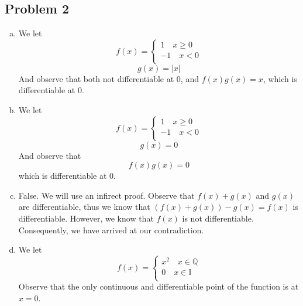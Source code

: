 \documentclass[12pt]{article}
\begin{document}
\subsection*{Problem 2}
\begin{enumerate}[a).]
    \item {
        We let
        $$ 
                f(x) = \left\{ 
                    \begin{array}{ll} 
                        1 \quad   x \ge 0\\
                        -1 \quad   x < 0\\
                    \end{array} \right.
        $$
        $$ 
                g(x) = |x|
        $$
        And observe that both not differentiable at $0$, and $f(x)g(x) = x$, which is differentiable at $0$. 
    }
    \item {
        We let 
        $$ 
                f(x) = \left\{ 
                    \begin{array}{ll} 
                        1 \quad   x \ge 0\\
                        -1 \quad   x < 0\\
                    \end{array} \right.
        $$
        $$
        g(x) = 0
        $$
        And observe that 
        $$ 
                f(x)g(x) = 0
        $$
        which is differentiable at $0$. 
    }
    \item {
        False. 
        We will use an infirect proof. 
        Observe that $f(x) + g(x)$ and $g(x)$ are differentiable, thus we know that $(f(x) + g(x)) - g(x) = f(x)$ is differentiable. 
        However, we know that $f(x)$ is not differentiable. 
        Consequently, we have arrived at our contradiction. 
    }
    \item {
        We let
        $$ 
                f(x) = \left\{ 
                    \begin{array}{ll} 
                        x^2 \quad   x \in \mathbb{Q}\\
                        0 \quad   x \in \mathbb{I}\\
                    \end{array} \right.
        $$
        Observe that the only continuous and differentiable point of the function is at $x = 0$. 
    }
\end{enumerate}
\end{document}
